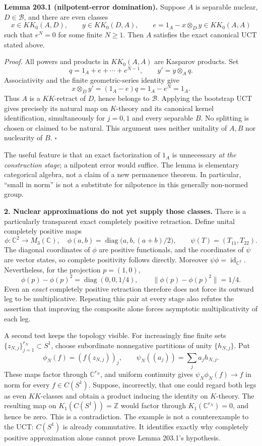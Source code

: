 \documentclass[11pt,a4paper]{article}
\newcommand{\Z}{\mathbb{Z}}
\newcommand{\C}{\mathbb{C}}
\begin{document}
\textbf{Lemma 203.1 (nilpotent-error domination).}
Suppose $A$ is separable nuclear, $D\in\mathcal B$, and there are even
classes
\[
 x\in KK_0(A,D),\qquad y\in KK_0(D,A),\qquad
 e=1_A-x\otimes_Dy\in KK_0(A,A)
\]
such that $e^N=0$ for some finite $N\ge1$. Then $A$ satisfies the exact
canonical UCT stated above.

\emph{Proof.}
All powers and products in $KK_0(A,A)$ are Kasparov products. Set
\[
 q=1_A+e+\cdots+e^{N-1},\qquad y'=y\otimes_Aq.
\]
Associativity and the finite geometric-series identity give
\[
 x\otimes_Dy'=(1_A-e)q=1_A-e^N=1_A.
\]
Thus $A$ is a $KK$-retract of $D$, hence belongs to $\mathcal B$. Applying
the bootstrap UCT gives precisely its natural map on $K$-theory and its
canonical kernel identification, simultaneously for $j=0,1$ and every
separable $B$. No splitting is chosen or claimed to be natural.
This argument uses neither unitality of $A,B$ nor nuclearity of $B$.
\hfill$\square$

The useful feature is that an exact factorization of $1_A$ is unnecessary
\emph{at the construction stage}; a nilpotent error would suffice. The
lemma is elementary categorical algebra, not a claim of a new permanence
theorem. In particular, ``small in norm'' is not a substitute for
nilpotence in this generally non-normed group.

\textbf{2. Nuclear approximations do not yet supply those classes.}
There is a particularly transparent exact completely positive retraction.
Define unital completely positive maps
\[
 \phi:\C^2\longrightarrow M_3(\C),\quad
 \phi(a,b)=\operatorname{diag}\bigl(a,b,(a+b)/2\bigr),
 \qquad
 \psi(T)=(T_{11},T_{22}).
\]
The diagonal coordinates of $\phi$ are positive functionals, and the
coordinates of $\psi$ are vector states, so complete positivity follows
directly. Moreover $\psi\phi=\operatorname{id}_{\C^2}$. Nevertheless,
for the projection $p=(1,0)$,
\[
 \phi(p)-\phi(p)^2=\operatorname{diag}(0,0,1/4),\qquad
 \|\phi(p)-\phi(p)^2\|=1/4.
\]
Even an \emph{exact} completely positive retraction therefore does not force
its outward leg to be multiplicative. Repeating this pair at every stage
also refutes the assertion that improving the composite alone forces
asymptotic multiplicativity of each leg.

A second test keeps the topology visible. For increasingly fine finite
sets $\{z_{N,j}\}_{j=1}^{r_N}\subset S^1$, choose subordinate nonnegative
partitions of unity $\{h_{N,j}\}$. Put
\[
 \phi_N(f)=(f(z_{N,j}))_j,\qquad
 \psi_N((a_j))=\sum_j a_jh_{N,j}.
\]
These maps factor through $\C^{r_N}$, and uniform continuity gives
$\psi_N\phi_N(f)\to f$ in norm for every $f\in C(S^1)$.
Suppose, incorrectly, that one could regard both legs as even
$KK$-classes and obtain a product inducing the identity on $K$-theory.
The resulting map on $K_1(C(S^1))=\Z$ would factor through
$K_1(\C^{r_N})=0$, and hence be zero. This is a contradiction.
The example is not a counterexample to the UCT: $C(S^1)$ is already
commutative. It identifies exactly why completely positive approximation
alone cannot prove Lemma 203.1's hypothesis.
\end{document}
